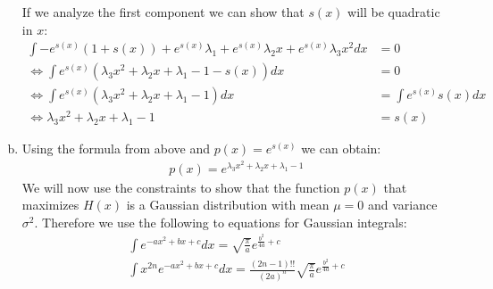 \documentclass[10pt,a4paper]{article}
\begin{document}
\begin{enumerate}[(a)]
If we analyze the first component we can show that $s(x)$ will be quadratic in $x$:
\begin{align*}
    \int -e^{s(x)}(1+s(x))+e^{s(x)}\lambda_1 + e^{s(x)}\lambda_2x + e^{s(x)}\lambda_3 x^2 dx &= 0\\
    \Leftrightarrow \int e^{s(x)}(\lambda_3 x^2+\lambda_2 x + \lambda_1 - 1 - s(x)) dx &= 0\\
    \Leftrightarrow \int e^{s(x)}(\lambda_3 x^2+\lambda_2 x + \lambda_1 - 1) dx &= \int e^{s(x)}s(x) dx\\
    \Leftrightarrow \lambda_3 x^2+\lambda_2 x + \lambda_1 - 1 &= s(x)
\end{align*}

\item
Using the formula from above and $p(x) = e^{s(x)}$ we can obtain:
\begin{align*}
    p(x) = e^{\lambda_3 x^2+\lambda_2 x + \lambda_1 - 1}
\end{align*}
We will now use the constraints to show that the function $p(x)$ that maximizes $H(x)$ is a Gaussian distribution with mean $\mu = 0$ and variance $\sigma^2$.
Therefore we use the following to equations for Gaussian integrals:
\begin{align}
    \int e^{-ax^2+bx+c} dx = \sqrt{\frac{\pi}{a}}e^{\frac{b^2}{4a}+c}\\
    \int x^{2n}e^{-ax^2+bx+c} dx = \frac{(2n-1)!!}{(2a)^n}\sqrt{\frac{\pi}{a}}e^{\frac{b^2}{4a}+c}
\end{align}


\end{enumerate}
\end{document}
